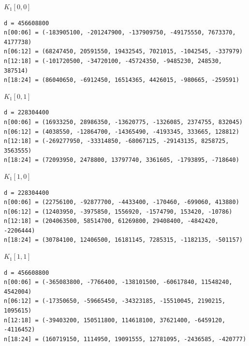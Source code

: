 \par\medskip\noindent\begin{minipage}{\textwidth}
\textbf{$K_{1}[0,0]$}
\begin{Verbatim}[fontsize=\fontsize{8}{9.4}\selectfont]
d = 456608800
n[00:06] = (-183905100, -201247900, -137909750, -49175550, 7673370, 4177738)
n[06:12] = (68247450, 20591550, 19432545, 7021015, -1042545, -337979)
n[12:18] = (-101720500, -34720100, -45724350, -9485230, 248530, 387514)
n[18:24] = (86040650, -6912450, 16514365, 4426015, -980665, -259591)
\end{Verbatim}
\end{minipage}

\par\medskip\noindent\begin{minipage}{\textwidth}
\textbf{$K_{1}[0,1]$}
\begin{Verbatim}[fontsize=\fontsize{8}{9.4}\selectfont]
d = 228304400
n[00:06] = (16933250, 28986350, -13620775, -1326085, 2374755, 832045)
n[06:12] = (4038550, -12864700, -14365490, -4193345, 333665, 128812)
n[12:18] = (-269277950, -33314850, -68067125, -29143135, 8258725, 3563555)
n[18:24] = (72093950, 2478800, 13797740, 3361605, -1793895, -718640)
\end{Verbatim}
\end{minipage}

\par\medskip\noindent\begin{minipage}{\textwidth}
\textbf{$K_{1}[1,0]$}
\begin{Verbatim}[fontsize=\fontsize{8}{9.4}\selectfont]
d = 228304400
n[00:06] = (22756100, -92877700, -4433400, -170460, -699060, 413880)
n[06:12] = (12403950, -3975850, 1556920, -1574790, 153420, -10786)
n[12:18] = (204063500, 58514700, 61269800, 29408400, -4842420, -2206444)
n[18:24] = (30784100, 12406500, 16181145, 7285315, -1182135, -501157)
\end{Verbatim}
\end{minipage}

\par\medskip\noindent\begin{minipage}{\textwidth}
\textbf{$K_{1}[1,1]$}
\begin{Verbatim}[fontsize=\fontsize{8}{9.4}\selectfont]
d = 456608800
n[00:06] = (-365083800, -7766400, -138101500, -60617840, 11548240, 4542004)
n[06:12] = (-17350650, -59665450, -34323185, -15510045, 2190215, 1095615)
n[12:18] = (-39403200, 150511800, 114618100, 37621400, -6459120, -4116452)
n[18:24] = (160719150, 1114950, 19091555, 12781095, -2436585, -420777)
\end{Verbatim}
\end{minipage}

